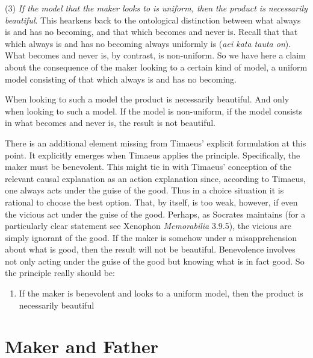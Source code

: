 (3) \emph{If the model that the maker looks to is uniform, then the product is necessarily beautiful}. This hearkens back to the ontological distinction between what always is and has no becoming, and that which becomes and never is. Recall that that which always is and has no becoming always uniformly is (\emph{aei kata tauta on}). What becomes and never is, by contrast, is non-uniform. So we have here a claim about the consequence of the maker looking to a certain kind of model, a uniform model consisting of that which always is and has no becoming. 

When looking to such a model the product is necessarily beautiful. And only when looking to such a model. If the model is non-uniform, if the model consists in what becomes and never is, the result is not beautiful. 

There is an additional element missing from Timaeus' explicit formulation at this point. It explicitly emerges when Timaeus applies the principle. Specifically, the maker must be benevolent. This might tie in with Timaeus' conception of the relevant causal explanation as an action explanation since, according to Timaeus, one always acts under the guise of the good. Thus in a choice situation it is rational to choose the best option. That, by itself, is too weak, however, if even the vicious act under the guise of the good. Perhaps, as Socrates maintains (for a particularly clear statement see Xenophon \emph{Memorabilia} 3.9.5), the vicious are simply ignorant of the good. If the maker is somehow under a misapprehension about what is good, then the result will not be beautiful. Benevolence involves not only acting under the guise of the good but knowing what is in fact good. So the principle really should be:
\begin{enumerate}[(3*)]
	\item If the maker is benevolent and looks to a uniform model, then the product is necessarily beautiful
\end{enumerate}


\section{Maker and Father} %
\label{sec:maker_and_father}

